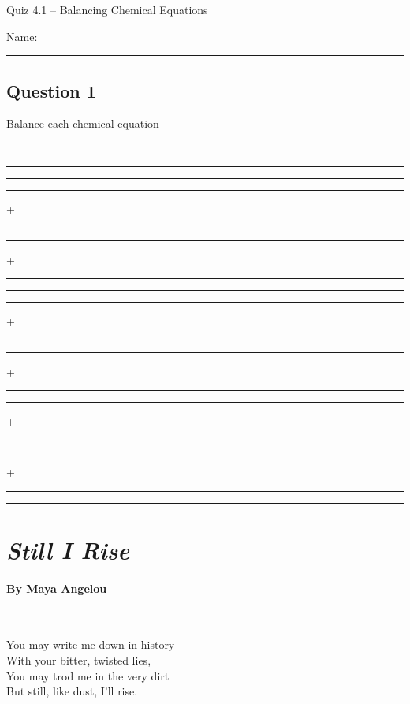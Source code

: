 \documentclass[11pt, letterpaper]{memoir}
\begin{document}
	\begin{center}
		{\large	Quiz 4.1 -- Balancing Chemical Equations}
	\end{center}
{\large Name: \rule[-1mm]{4in}{.1pt}
	
	\subsection*{Question 1}
	Balance each chemical equation
	
	{\large
		\vspace{2em}
		\rule[-1mm]{0.35in}{.1pt}  \rule[-1mm]{0.35in}{.1pt} \rule[-1mm]{0.35in}{.1pt} \rule[-1mm]{0.35in}{.1pt}
		
		\vspace{5em}
		\rule[-1mm]{0.35in}{.1pt} + \rule[-1mm]{0.35in}{.1pt} \rule[-1mm]{0.35in}{.1pt} + \rule[-1mm]{0.35in}{.1pt}
			
		\vspace{5em}
		\rule[-1mm]{0.35in}{.1pt} \rule[-1mm]{0.35in}{.1pt} + \rule[-1mm]{0.35in}{.1pt}
		
		\vspace{5em}
		\rule[-1mm]{0.35in}{.1pt} + \rule[-1mm]{0.35in}{.1pt} \rule[-1mm]{0.35in}{.1pt} + \rule[-1mm]{0.35in}{.1pt}
		
		\vspace{5em}
		\rule[-1mm]{0.35in}{.1pt} + \rule[-1mm]{0.35in}{.1pt} \rule[-1mm]{0.35in}{.1pt}
	}
\newpage
\pagestyle{empty}
\addtocounter{page}{-1}
\section*{\emph{Still I Rise}}
\paragraph{By Maya Angelou}~

\vspace{1em}
\begin{minipage}[t]{0.49\linewidth}

	You may write me down in history\\
	With your bitter, twisted lies,\\
	You may trod me in the very dirt\\
	But still, like dust, I'll rise.


\end{minipage}}
\end{document}
